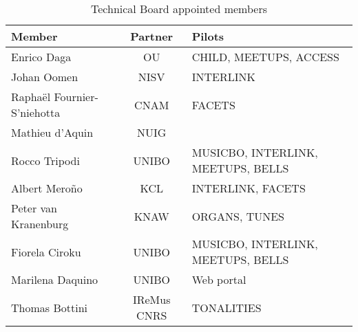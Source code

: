\begin{table}[h]
    \caption{Technical Board appointed members}
    \label{tab:tbmembers}
    \centering
    \begin{tabular}{|p{5cm}|c|l|}\hline
\textbf{Member} &	\textbf{Partner} &	\textbf{Pilots} \\\hline
Enrico Daga & OU & CHILD, MEETUPS, ACCESS \\\hline
Johan Oomen & NISV & INTERLINK \\\hline
Raphaël Fournier-S'niehotta &	CNAM &	FACETS \\\hline
Mathieu d'Aquin & NUIG & \\\hline 
Rocco Tripodi &	UNIBO &	MUSICBO, INTERLINK, MEETUPS, BELLS	 \\\hline
Albert Meroño &	KCL & INTERLINK, FACETS \\\hline
Peter van Kranenburg &	KNAW &	ORGANS, TUNES \\\hline
Fiorela Ciroku & UNIBO & MUSICBO, INTERLINK, MEETUPS, BELLS \\\hline
Marilena Daquino &	UNIBO &	Web portal \\\hline
Thomas Bottini & IReMus CNRS & TONALITIES \\\hline
    \end{tabular}
\end{table}


